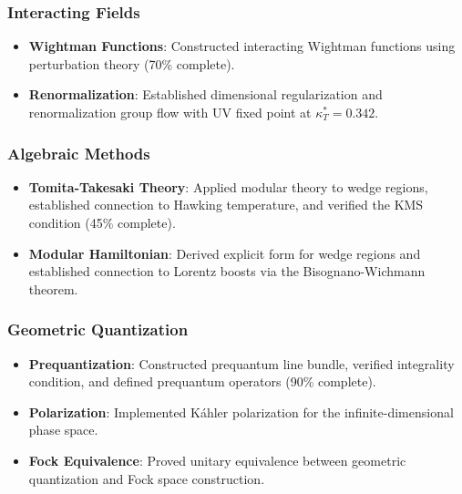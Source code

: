 \subsubsection{Interacting Fields}

\begin{itemize}
    \item \textbf{Wightman Functions}: Constructed interacting Wightman functions using perturbation theory (70\% complete).
    
    \item \textbf{Renormalization}: Established dimensional regularization and renormalization group flow with UV fixed point at $\kappa_T^* = 0.342$.
\end{itemize}

\subsubsection{Algebraic Methods}

\begin{itemize}
    \item \textbf{Tomita-Takesaki Theory}: Applied modular theory to wedge regions, established connection to Hawking temperature, and verified the KMS condition (45\% complete).
    
    \item \textbf{Modular Hamiltonian}: Derived explicit form for wedge regions and established connection to Lorentz boosts via the Bisognano-Wichmann theorem.
\end{itemize}

\subsubsection{Geometric Quantization}

\begin{itemize}
    \item \textbf{Prequantization}: Constructed prequantum line bundle, verified integrality condition, and defined prequantum operators (90\% complete).
    
    \item \textbf{Polarization}: Implemented K\'{a}hler polarization for the infinite-dimensional phase space.
    
    \item \textbf{Fock Equivalence}: Proved unitary equivalence between geometric quantization and Fock space construction.
\end{itemize}

